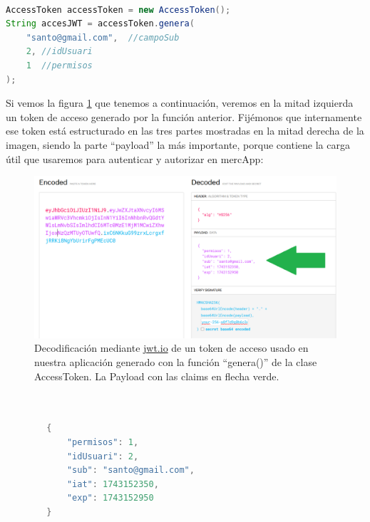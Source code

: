 \documentclass[a4paper,12pt]{report}
\begin{document}
		
		
\begin{lstlisting}[language=Java, basicstyle=\ttfamily\footnotesize, keywordstyle=\color{magenta}]

AccessToken accessToken = new AccessToken();
String accesJWT = accessToken.genera(
	"santo@gmail.com",  //campoSub
	2, //idUsuari
	1  //permisos
);


\end{lstlisting}
		
		Si vemos la figura \ref{fig:jwtioMostraPayload} que tenemos a continuación, veremos en la mitad izquierda un token de acceso generado por la función anterior. Fijémonos que internamente ese token está estructurado en las tres partes mostradas en la mitad derecha de la imagen, siendo la parte ``payload'' la más importante, porque contiene la carga útil que usaremos para autenticar y autorizar en mercApp:
		
	
			\setlength{\belowcaptionskip}{3pt}
			\FloatBarrier
			\begin{figure}[H]
				\centering
				\caption{Decodificación mediante \href{https://www.jwt.io}{jwt.io} de un token de acceso usado en nuestra aplicación generado con la función ``genera()'' de la clase AccessToken. La Payload con las claims en flecha verde.}
				\includegraphics[width=1\textwidth]{img/jwtio_mostra_payload.png}

				\label{fig:jwtioMostraPayload} 
			\end{figure}
			\FloatBarrier

		
\begin{lstlisting}[language=Java, basicstyle=\ttfamily\footnotesize, keywordstyle=\color{magenta}]
			
		
		{
		    "permisos": 1,
		    "idUsuari": 2,
		    "sub": "santo@gmail.com",
		    "iat": 1743152350,
		    "exp": 1743152950
		}
			
\end{lstlisting}
		
\end{document}
